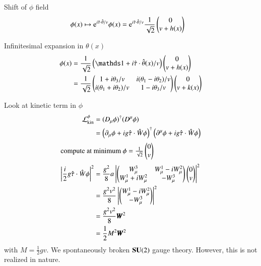 Shift of $\phi$ field
\begin{align}
   \phi(x) &\mapsto \mathrm{e}^{i \hat{\tau} \cdot \hat{\theta} / v} \phi(x) = \mathrm{e}^{i \hat{\tau} \cdot \hat{\theta} / v} \frac{1}{\sqrt{2}}  \begin{pmatrix} 0 \\ {v +h(x)} \end{pmatrix}
\end{align}

Infinitesimal expansion in $\theta(x)$
\begin{align*}
   \phi(x) &= \frac{1}{\sqrt{2}} \left( \id + i \hat{\tau} \cdot \hat{\theta}(x)/v \right) \begin{pmatrix} 0 \\ {v + h(x)}\end{pmatrix} \\
&= \frac{1}{\sqrt{2}} \begin{pmatrix} 1 + i\theta_3 /v & i(\theta_1 - i\theta_2)/v \\ i(\theta_1 + i\theta_2) / v & 1 - i\theta_3 /v \end{pmatrix} \begin{pmatrix} 0 \\ v + k(x)\end{pmatrix}
\end{align*}

Look at kinetic term in $\phi$
\begin{align*}
   \mathcal{L}_{\text{kin}}^\phi &= (D_\mu \phi)^\dagger (D^\mu \phi) \\
                          &= \left( \partial_\mu \phi + i g \hat{\tau} \cdot \hat{W} \phi \right)^\dagger \left( \partial^\mu \phi + i g \hat{\tau} \cdot \hat{W} \phi \right) \\
                          \shortintertext{compute at minimum $\phi = \frac{1}{\sqrt{2}} \begin{pmatrix} 0 \\ v\end{pmatrix}$}
                          \left| \frac{i}{2} g \hat{\tau} \cdot \hat{W} \phi \right|^2 & = \frac{g^2}{8}a \left| \begin{pmatrix} W^3_\mu & W^1_\mu - i W_\mu^2 \\ W^1_\mu + i W_\mu^2 & -W_\mu^3 \end{pmatrix} \begin{pmatrix} 0 \\ v\end{pmatrix} \right|^2 \\
                         &= \frac{g^2 v^2}{8} \left| \begin{pmatrix} W_\mu^1 - iW_\mu^2 \\ -W_\mu^3\end{pmatrix} \right|^2 \\
                         &= \frac{g^2 v^2}{8} \pmb{W}^2 \\
                         &= \frac{1}{2} M^2 \pmb{W}^2
\end{align*}
with $M = \frac{1}{2}gv$. We spontaneously broken $\mathbf{SU}(2)$ gauge theory. However, this is not realized in nature.
